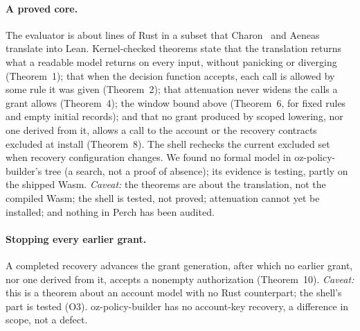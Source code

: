 \paragraph{A proved core.} The evaluator is about  lines of
 Rust in a subset that Charon~\cite{charon} and Aeneas~\cite{aeneas} translate
into Lean. Kernel-checked theorems state that the translation returns what a
readable model returns on every input, without panicking or diverging
(Theorem~1); that when the decision function accepts,
each call is allowed by some rule it was given (Theorem~2); that attenuation never widens the calls a grant allows (Theorem~4); the window bound
above (Theorem~6, for fixed rules and empty initial records); and that no grant
produced by scoped lowering, nor one derived from it, allows a call to the
account or the recovery contracts excluded at install (Theorem~8). The shell
rechecks the current excluded set when recovery configuration changes. We
found no formal model in oz-policy-builder's tree (a search, not a proof of
absence); its evidence is testing, partly on the shipped Wasm.
\emph{Caveat:} the theorems are about the translation, not the compiled Wasm; the
shell is tested, not proved; attenuation cannot yet be installed; and nothing in
Perch has been audited.

\paragraph{Stopping every earlier grant.} A completed recovery advances the grant
generation, after which no earlier grant, nor one derived from it, accepts a
nonempty authorization (Theorem~10). \emph{Caveat:} this is a theorem about an
account model with no Rust counterpart; the shell's part is tested (O3).
oz-policy-builder has no account-key recovery, a difference in scope, not a
defect.
